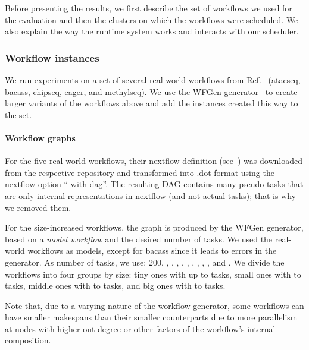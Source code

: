 \documentclass[conference]{IEEEtran}
\newcommand{\new}[1]{{#1}}
\begin{document}
Before presenting the results, we first describe the set of workflows we used for the evaluation and
then the clusters on which the workflows were scheduled.
We also explain the way the runtime system works and interacts with our scheduler. 

\medskip
\subsubsection{Workflow instances}
We run experiments on a set of several real-world workflows from Ref.~\cite{lotaru}
(atacseq, bacass, chipseq, eager, and methylseq). We use the WFGen generator~\cite{COLEMAN202216} to
create larger variants of the workflows above and add the instances created this way to the set.

\medskip

\paragraph{Workflow graphs}
For the five real-world workflows, their nextflow definition (see~\cite{ewels2020nf}) was downloaded from the
respective repository and transformed into .dot format using the nextflow option ``-with-dag''.
The resulting DAG contains many pseudo-tasks that are only internal representations in nextflow
(and not actual tasks); that is why we removed them.

For the size-increased workflows, the graph is produced by the WFGen generator, based on a {\em model workflow} and
the desired number of tasks.
We used the real-world workflows as models, except for bacass since it leads to errors in the generator.
%
As number of tasks, we use: 200, , , , , ,
, , , , and .
We divide the workflows into four groups by size: tiny ones with up to  tasks, small ones with  to  tasks,
middle ones with  to  tasks, and big ones with  to  tasks.

\new{Note that, due to a varying nature of the workflow generator, some workflows can have smaller makespans than their
smaller counterparts due to more parallelism at nodes with higher out-degree or other factors of the workflow's
internal composition.}

\medskip
\end{document}
